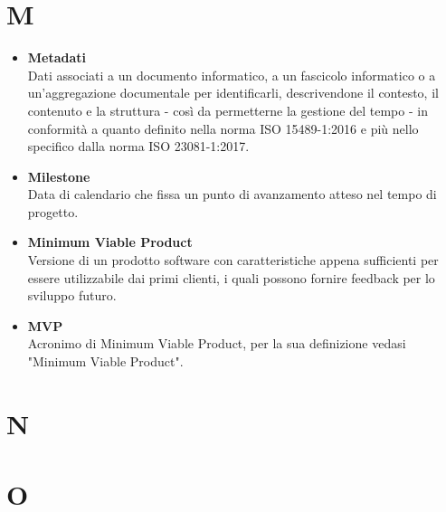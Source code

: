 \documentclass[a4paper,12pt]{article}
\begin{document}
        \section*{M} {
            \begin{itemize}
                \item \textbf{Metadati}\\
                    Dati associati a un documento informatico, a un fascicolo informatico o a un'aggregazione documentale per identificarli, descrivendone il contesto, il contenuto e la struttura - così da permetterne la gestione del tempo - in conformità a quanto definito nella norma ISO 15489-1:2016 e più nello specifico dalla norma ISO 23081-1:2017.
                \item \textbf{Milestone}\\
                    Data di calendario che fissa un punto di avanzamento atteso nel tempo di progetto.
                \item \textbf{Minimum Viable Product}\\
                    Versione di un prodotto software con caratteristiche appena sufficienti per essere utilizzabile dai primi clienti, i quali possono fornire feedback per lo sviluppo futuro.
                \item \textbf{MVP}\\
                    Acronimo di Minimum Viable Product, per la sua definizione vedasi "Minimum Viable Product".
            \end{itemize}
        }
        \newpage

        \section*{N} {
            
        }
        \newpage

        \section*{O} {
            
        }
        \newpage
\end{document}
